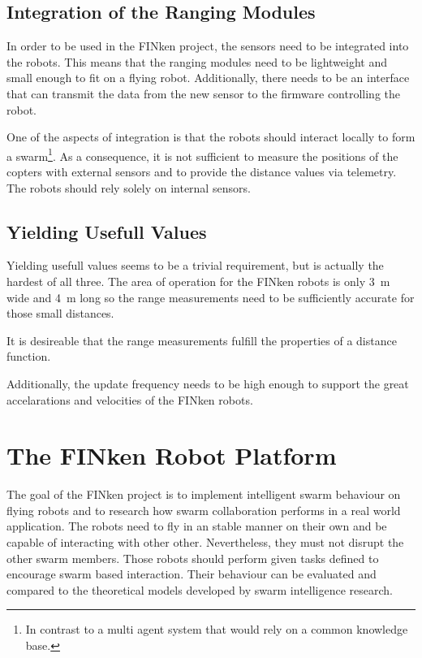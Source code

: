 \subsection{Integration of the Ranging Modules}
\label{req2}
In order to be used in the FINken project, the sensors need to be integrated into the robots.
This means that the ranging modules need to be lightweight and small enough to fit on a flying robot.
Additionally, there needs to be an interface that can transmit the data from the new sensor to the firmware controlling the robot.

One of the aspects of integration is that the robots should interact locally to form a swarm\footnote{
In contrast to a multi agent system that would rely on a common knowledge base.}.
As a consequence, it is not sufficient to measure the positions of the copters with external sensors and to provide the distance values via telemetry. The robots should rely solely on internal sensors.

\subsection{Yielding Usefull Values}
\label{req3}
Yielding usefull values seems to be a trivial requirement, but is actually the hardest of all three.
The area of operation for the FINken robots is only \SI{3}{m} wide and \SI{4}{m} long so the range measurements need to be sufficiently accurate for those small distances.

It is desireable that the range measurements fulfill the properties of a distance function.

Additionally, the update frequency needs to be high enough to support the great accelarations and velocities of the FINken robots.


\section{The FINken Robot Platform}


The goal of the FINken project is to implement intelligent swarm behaviour on flying robots and to research how swarm collaboration performs in a real world application.
The robots need to fly in an stable manner on their own and be capable of interacting with other other.
Nevertheless, they must not disrupt the other swarm members.
Those robots should perform given tasks defined to encourage swarm based interaction.
Their behaviour can be evaluated and compared to the theoretical models developed by swarm intelligence research.

